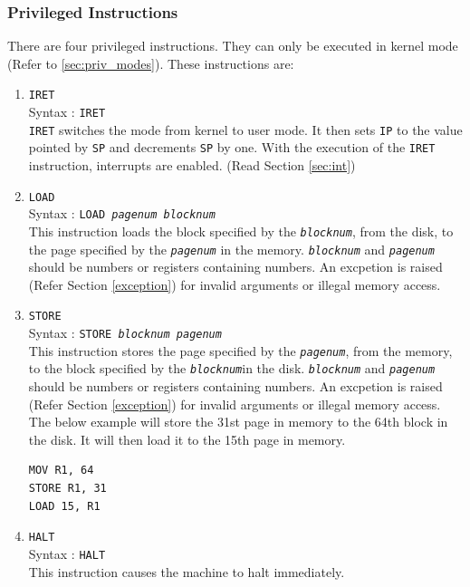 \documentclass[11pt]{report}
\begin{document}
\subsubsection{Privileged Instructions}
There are four privileged instructions. They can only be executed in kernel mode (Refer to \ref{sec:priv_modes}).  These instructions are:
\begin{enumerate}

\item \texttt{IRET}\\
Syntax : \texttt{IRET}\\
\texttt{IRET} switches the mode from kernel to user mode. It then sets \texttt{IP} to the value pointed by \texttt{SP} and decrements \texttt{SP} by one. With the execution of the \texttt{IRET} instruction, interrupts are enabled. (Read Section \ref{sec:int})

\item \texttt{LOAD}\\
Syntax : \texttt{LOAD \textit{pagenum} \textit{blocknum}}\\
This instruction loads the block specified by the \texttt{\textit{blocknum}}, from the disk, to the page specified by the \texttt{\textit{pagenum}} in the memory. \texttt{\textit{blocknum}} and \texttt{\textit{pagenum}} should be numbers or registers containing numbers. An excpetion is raised (Refer Section \ref{exception}) for invalid arguments or illegal memory access.

\item \texttt{STORE}\\
Syntax : \texttt{STORE \textit{blocknum} \textit{pagenum} }\\ 
This instruction stores the page specified by the \texttt{\textit{pagenum}}, from the memory, to the block specified by the \texttt{\textit{blocknum}}in the disk. \texttt{\textit{blocknum}} and \texttt{\textit{pagenum}} should be numbers or registers containing numbers. An excpetion is raised (Refer Section \ref{exception}) for invalid arguments or illegal memory access.\\

The below example will store the 31st page in memory to the 64th block in the disk. It will then load it to the 15th page in memory.
\begin{verbatim}
MOV R1, 64
STORE R1, 31
LOAD 15, R1	
\end{verbatim}	

\item \texttt{HALT}\\
Syntax : \texttt{HALT}\\
This instruction causes the machine to halt immediately. 
\end{enumerate}
\end{document}
